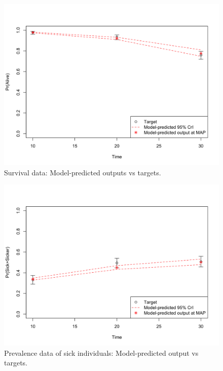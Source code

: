 \documentclass[]{book}
\begin{document}
\begin{figure}

{\centering \includegraphics[width=33.33in]{../figs/04_posterior_vs_targets_survival} 

}

\caption{Survival data: Model-predicted outputs vs targets.}\label{fig:04-surv}
\end{figure}

\begin{figure}

{\centering \includegraphics[width=33.33in]{../figs/04_posterior_vs_targets_prevalence} 

}

\caption{Prevalence data of sick individuals: Model-predicted output vs targets.}\label{fig:04-prevalence}
\end{figure}
\end{document}
